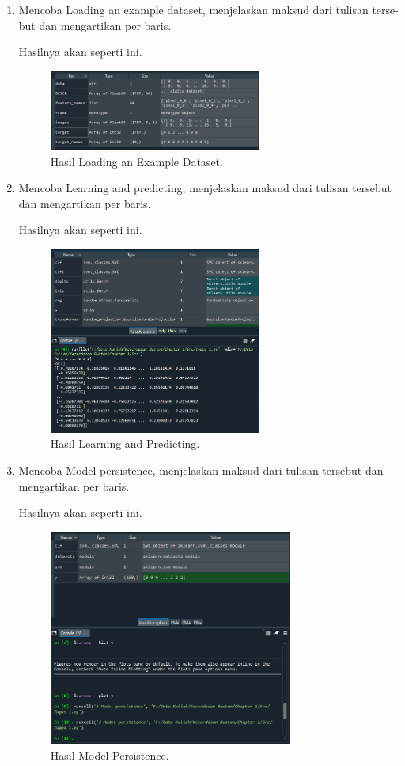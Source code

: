 \begin{enumerate}
	\item Mencoba Loading an example dataset, menjelaskan maksud dari tulisan terse-but dan mengartikan per baris.
	
	
	Hasilnya akan seperti ini.
	\begin{figure}[H]
		\includegraphics[width=7cm]{figures/chapter1/praktek/hasil1.PNG}
		\centering
		\caption{Hasil Loading an Example Dataset.}
	\end{figure}

	\item Mencoba  Learning  and  predicting,  menjelaskan  maksud  dari  tulisan  tersebut dan mengartikan per baris.
	
	
	Hasilnya akan seperti ini.
	\begin{figure}[H]
		\includegraphics[width=7cm]{figures/chapter1/praktek/hasil2.PNG}
		\centering
		\caption{Hasil Learning and Predicting.}
	\end{figure}

	\item Mencoba Model persistence, menjelaskan maksud dari tulisan tersebut dan mengartikan per baris.
	
	
	Hasilnya akan seperti ini.
	\begin{figure}[H]
		\includegraphics[width=8cm]{figures/chapter1/praktek/hasil3.PNG}
		\centering
		\caption{Hasil Model Persistence.}
	\end{figure}


\end{enumerate}
